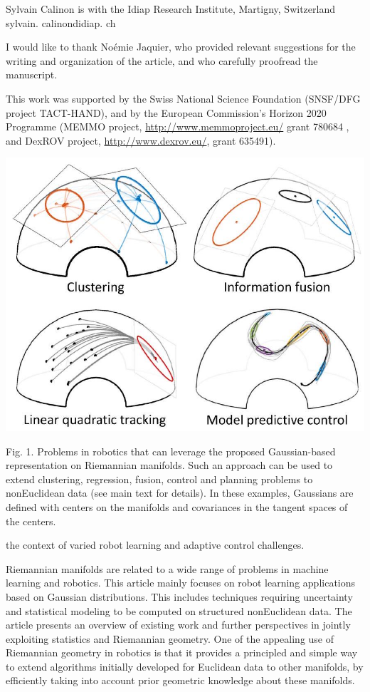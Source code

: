 \documentclass[10pt]{article}
\begin{document}
Sylvain Calinon is with the Idiap Research Institute, Martigny, Switzerland sylvain. calinondidiap. ch

I would like to thank Noémie Jaquier, who provided relevant suggestions for the writing and organization of the article, and who carefully proofread the manuscript.

This work was supported by the Swiss National Science Foundation (SNSF/DFG project TACT-HAND), and by the European Commission's Horizon 2020 Programme (MEMMO project, \href{http://www.memmoproject.eu/}{http://www.memmoproject.eu/} grant 780684 , and DexROV project, \href{http://www.dexrov.eu/}{http://www.dexrov.eu/}, grant 635491).

\begin{center}
\includegraphics[max width=\textwidth]{2023_01_25_b4240e152b7ba97a594cg-01}
\end{center}

Fig. 1. Problems in robotics that can leverage the proposed Gaussian-based representation on Riemannian manifolds. Such an approach can be used to extend clustering, regression, fusion, control and planning problems to nonEuclidean data (see main text for details). In these examples, Gaussians are defined with centers on the manifolds and covariances in the tangent spaces of the centers.

the context of varied robot learning and adaptive control challenges.

Riemannian manifolds are related to a wide range of problems in machine learning and robotics. This article mainly focuses on robot learning applications based on Gaussian distributions. This includes techniques requiring uncertainty and statistical modeling to be computed on structured nonEuclidean data. The article presents an overview of existing work and further perspectives in jointly exploiting statistics and Riemannian geometry. One of the appealing use of Riemannian geometry in robotics is that it provides a principled and simple way to extend algorithms initially developed for Euclidean data to other manifolds, by efficiently taking into account prior geometric knowledge about these manifolds.
\end{document}
